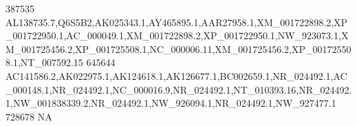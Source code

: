 \documentclass[a4paper]{article}
\begin{document}
\begin{Schunk}
\begin{Soutput}
387535                                                                                                                                                                                                                                                                                                                                                                                                                                                                                                                                                                                                                                                                                                                                                                                                                                     AL138735.7,Q6S5B2,AK025343.1,AY465895.1,AAR27958.1,XM_001722898.2,XP_001722950.1,AC_000049.1,XM_001722898.2,XP_001722950.1,NW_923073.1,XM_001725456.2,XP_001725508.1,NC_000006.11,XM_001725456.2,XP_001725508.1,NT_007592.15
645644                                                                                                                                                                                                                                                                                                                                                                                                                                                                                                                                                                                                                                                                                                                                                                                                                                                       AC141586.2,AK022975.1,AK124618.1,AK126677.1,BC002659.1,NR_024492.1,AC_000148.1,NR_024492.1,NC_000016.9,NR_024492.1,NT_010393.16,NR_024492.1,NW_001838339.2,NR_024492.1,NW_926094.1,NR_024492.1,NW_927477.1
728678                                                                                                                                                                                                                                                                                                                                                                                                                                                                                                                                                                                                                                                                                                                                                                                                                                                                                                                                                                                                                                                               NA

\end{Soutput}
\end{Schunk}
\end{document}
